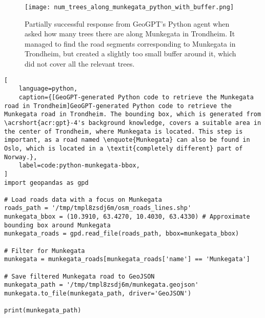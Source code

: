 \begin{figure}[htbp]
    \centering
    \texttt{[image: num\_trees\_along\_munkegata\_python\_with\_buffer.png]}
    \caption[Partially successful response from GeoGPT's Python agent when asked how many trees there are along Munkegata in Trondheim]{Partially successful response from GeoGPT's Python agent when asked how many trees there are along Munkegata in Trondheim. It managed to find the road segments corresponding to Munkegata in Trondheim, but created a slightly too small buffer around it, which did not cover all the relevant trees.}
    \label{fig:trees-along-munkegata-python-partial-success}
\end{figure}

\FloatBarrier

\begin{lstlisting}[
    language=python,
    caption={[GeoGPT-generated Python code to retrieve the Munkegata road in Trondheim]GeoGPT-generated Python code to retrieve the Munkegata road in Trondheim. The bounding box, which is generated from \acrshort{acr:gpt}-4's background knowledge, covers a suitable area in the center of Trondheim, where Munkegata is located. This step is important, as a road named \enquote{Munkegata} can also be found in Oslo, which is located in a \textit{completely different} part of Norway.},
    label=code:python-munkegata-bbox,
]
import geopandas as gpd

# Load roads data with a focus on Munkegata
roads_path = '/tmp/tmpl8zsdj6m/osm_roads_lines.shp'
munkegata_bbox = (10.3910, 63.4270, 10.4030, 63.4330) # Approximate bounding box around Munkegata
munkegata_roads = gpd.read_file(roads_path, bbox=munkegata_bbox)

# Filter for Munkegata
munkegata = munkegata_roads[munkegata_roads['name'] == 'Munkegata']

# Save filtered Munkegata road to GeoJSON
munkegata_path = '/tmp/tmpl8zsdj6m/munkegata.geojson'
munkegata.to_file(munkegata_path, driver='GeoJSON')

print(munkegata_path)
\end{lstlisting}

